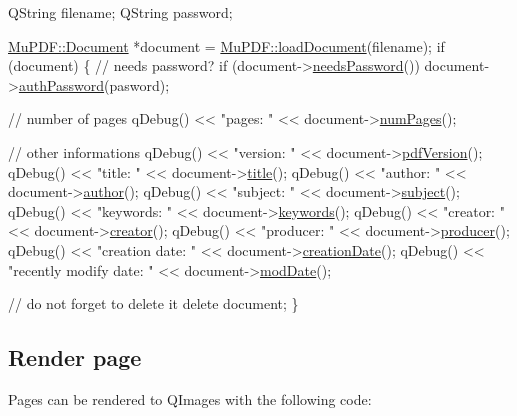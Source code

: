 \begin{DoxyCode}
QString filename;
QString password;

\hyperlink{class_mu_p_d_f_1_1_document}{MuPDF::Document} *document = \hyperlink{namespace_mu_p_d_f_a5cf746094bc9648aca0d4a83e3ac44b3}{MuPDF::loadDocument}(filename);
\textcolor{keywordflow}{if} (document) \{
    \textcolor{comment}{// needs password?}
    \textcolor{keywordflow}{if} (document->\hyperlink{class_mu_p_d_f_1_1_document_a1a13ec739fa4ead2caeb317c433c1756}{needsPassword}())
        document->\hyperlink{class_mu_p_d_f_1_1_document_a5d447dc019e82e7d6c55ee3d55a1a496}{authPassword}(pasword);
    
    \textcolor{comment}{// number of pages}
    qDebug() << \textcolor{stringliteral}{"pages: "} << document->\hyperlink{class_mu_p_d_f_1_1_document_aa45c6ede18c2d65cd151ba2759732c60}{numPages}();

    \textcolor{comment}{// other informations}
    qDebug() << \textcolor{stringliteral}{"version: "} << document->\hyperlink{class_mu_p_d_f_1_1_document_a3635f7be582da314499899a699a2fd75}{pdfVersion}();
    qDebug() << \textcolor{stringliteral}{"title: "} << document->\hyperlink{class_mu_p_d_f_1_1_document_a5823c559c6c48febeeb3eb1d7d83e10d}{title}();
    qDebug() << \textcolor{stringliteral}{"author: "} << document->\hyperlink{class_mu_p_d_f_1_1_document_a7f5a23afec90fffc45c1dc093aa025fd}{author}();
    qDebug() << \textcolor{stringliteral}{"subject: "} << document->\hyperlink{class_mu_p_d_f_1_1_document_ae784415521f4ed962da82018bbcc7f2f}{subject}();
    qDebug() << \textcolor{stringliteral}{"keywords: "} << document->\hyperlink{class_mu_p_d_f_1_1_document_a751dc7e3ed070eff251713c070a1f6e3}{keywords}();
    qDebug() << \textcolor{stringliteral}{"creator: "} << document->\hyperlink{class_mu_p_d_f_1_1_document_a1d44b5bc59d43c1138a4b4afbb245c01}{creator}();
    qDebug() << \textcolor{stringliteral}{"producer: "} << document->\hyperlink{class_mu_p_d_f_1_1_document_a4b609a777fa9939843a2922f9a292882}{producer}();
    qDebug() << \textcolor{stringliteral}{"creation date: "} << document->\hyperlink{class_mu_p_d_f_1_1_document_ac741bca965122fbd83c87ce21e28baf1}{creationDate}();
    qDebug() << \textcolor{stringliteral}{"recently modify date: "} << document->\hyperlink{class_mu_p_d_f_1_1_document_a9a84e656e58c556a61fe228ccdc3f643}{modDate}();

    \textcolor{comment}{// do not forget to delete it}
    \textcolor{keyword}{delete} document;
\}
\end{DoxyCode}
\hypertarget{index_render}{}\subsection{Render page}\label{index_render}
Pages can be rendered to Q\-Images with the following code\-:


